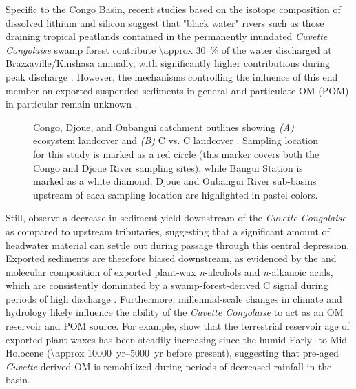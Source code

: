 Specific to the Congo Basin, recent studies based on the isotope composition of dissolved lithium and silicon suggest that "black water" rivers such as those draining tropical peatlands contained in the permanently inundated \textit{Cuvette Congolaise} swamp forest \citep[Figure \ref{Ch5Fig:1}A;][]{Keddy:2009cu} contribute \SI{\approx 30}{\%} of the water discharged at Brazzaville/Kinshasa annually, with significantly higher contributions during peak discharge \citep{Cardinal:2010ir,Henchiri:2016jh}. However, the mechanisms controlling the influence of this end member on exported suspended sediments in general and particulate OM (POM) in particular remain unknown \citep{Spencer:2016ho}.

\begin{figure}[ht]
	\caption[Congo catchment map showing landcover and \%C vs. \%C vegatation]{Congo, Djoue, and Oubangui catchment outlines showing \textit{(A)} ecosystem landcover \citep{Mayaux:2004uw} and \textit{(B)} C vs. C landcover \citep{Still:2010wh}. Sampling location for this study is marked as a red circle (this marker covers both the Congo and Djoue River sampling sites), while Bangui Station \citep{Bouillon:2012cw,Bouillon:2014ko} is marked as a white diamond. Djoue and Oubangui River sub-basins upstream of each sampling location are highlighted in pastel colors.}
	\label{Ch5Fig:1} 
\end{figure}

Still, \citet{Laraque:2009fz} observe a decrease in sediment yield downstream of the \textit{Cuvette Congolaise} as compared to upstream tributaries, suggesting that a significant amount of headwater material can settle out during passage through this central depression. Exported sediments are therefore biased downstream, as evidenced by the  and molecular composition of exported plant-wax \textit{n}-alcohols and \textit{n}-alkanoic acids, which are consistently dominated by a swamp-forest-derived C signal during periods of high discharge \citep{Hemingway:2016bq}. Furthermore, millennial-scale changes in climate and hydrology likely influence the ability of the \textit{Cuvette Congolaise} to act as an OM reservoir and POM source. For example, \citet{Schefuss:2016cp} show that the terrestrial reservoir age of exported plant waxes has been steadily increasing since the humid Early- to Mid-Holocene (\SIrange{\approx 10000}{5000}{yr} before present), suggesting that pre-aged \textit{Cuvette}-derived OM is remobilized during periods of decreased rainfall in the basin.

